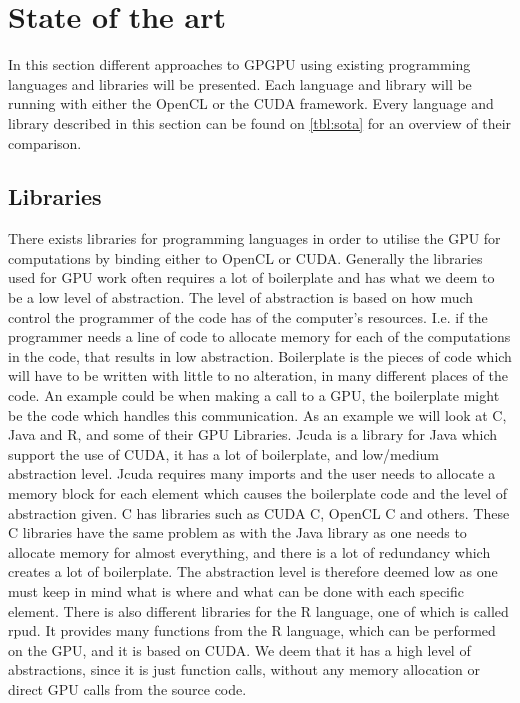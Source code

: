 \section{State of the art} %
\label{sec:state_of_the_art}
In this section different approaches to GPGPU using existing programming languages and libraries will be presented.
Each language and library will be running with either the OpenCL or the CUDA framework.
Every language and library described in this section can be found on \ref{tbl:sota} for an overview of their comparison.
      

\subsection{Libraries} 
There exists libraries for programming languages in order to utilise the GPU for computations by binding either to OpenCL or CUDA.
Generally the libraries used for GPU work often requires a lot of boilerplate and has what we deem to be a low level of abstraction.
The level of abstraction is based on how much control the programmer of the code has of the computer's resources.
I.e. if the programmer needs a line of code to allocate memory for each of the computations in the code, that results in low abstraction.
Boilerplate is the pieces of code which will have to be written with little to no alteration, in many different places of the code.
An example could be when making a call to a GPU, the boilerplate might be the code which handles this communication.
As an example we will look at C, Java and R, and some of their GPU Libraries.
Jcuda is a library for Java which support the use of CUDA, it has a lot of boilerplate, and low/medium abstraction level\citep{Java_library}. 
Jcuda requires many imports and the user needs to allocate a memory block for each element which causes the boilerplate code and the level of abstraction given.\citep{Java_malloc}
C has libraries such as CUDA C, OpenCL C and others.
These C libraries have the same problem as with the Java library as one needs to allocate memory for almost everything, and there is a lot of redundancy which creates a lot of boilerplate.
The abstraction level is therefore deemed low as one must keep in mind what is where and what can be done with each specific element.\citep{C_CUDA} 
There is also different libraries for the R language, one of which is called rpud.
It provides many functions from the R language, which can be performed on the GPU, and it is based on CUDA.
We deem that it has a high level of abstractions, since it is just function calls, without any memory allocation or direct GPU calls from the source code. \citep{Rcuda}                                                 


